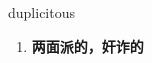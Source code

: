 
\begin{frame}
{\huge duplicitous}
\begin{center}
\begin{enumerate}\Large
  \item \textbf{两面派的，奸诈的}
\end{enumerate}
\end{center}
\end{frame}
